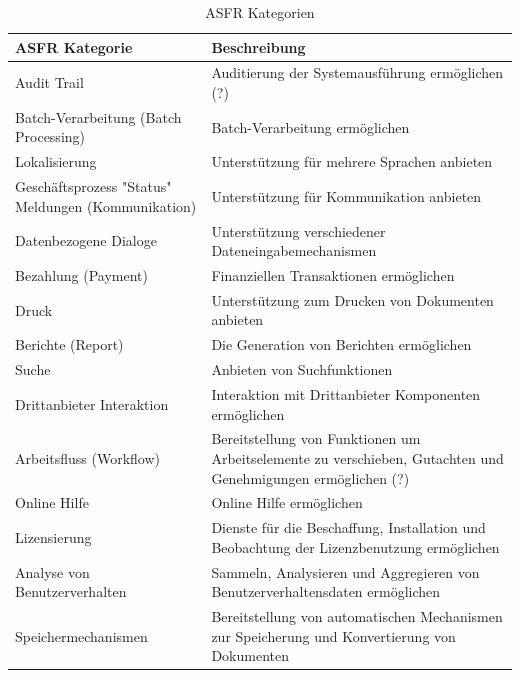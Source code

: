 \begin{table}[h] %
\caption{ASFR Kategorien \cite{Ros02}}
\centering
\begin{tabular}{|p{3cm}|p{5cm}|}
	\hline
	\textbf{ASFR Kategorie} & \textbf{Beschreibung} \\ %
	\hline
  	Audit Trail & Auditierung der Systemausführung ermöglichen (?) \\%
	\hline
	Batch-Verarbeitung (Batch Processing) & Batch-Verarbeitung ermöglichen \\
	\hline
	Lokalisierung & Unterstützung für mehrere Sprachen anbieten \\
	\hline
	Geschäftsprozess "Status" Meldungen (Kommunikation) & Unterstützung für Kommunikation anbieten \\
	\hline
	Datenbezogene Dialoge & Unterstützung verschiedener Dateneingabemechanismen \\
	\hline
	Bezahlung (Payment) & Finanziellen Transaktionen ermöglichen \\
	\hline
	Druck & Unterstützung zum Drucken von Dokumenten anbieten \\
	\hline
	Berichte (Report) & Die Generation von Berichten ermöglichen \\
	\hline
	Suche & Anbieten von Suchfunktionen \\
	\hline
	Drittanbieter Interaktion & Interaktion mit Drittanbieter Komponenten ermöglichen \\
	\hline
	Arbeitsfluss (Workflow) & Bereitstellung von Funktionen um Arbeitselemente zu verschieben, Gutachten und Genehmigungen ermöglichen (?)\\
	\hline
	Online Hilfe & Online Hilfe ermöglichen \\
	\hline
	Lizensierung & Dienste für die Beschaffung, Installation und Beobachtung der Lizenzbenutzung ermöglichen \\
	\hline
	Analyse von Benutzerverhalten & Sammeln, Analysieren und Aggregieren von Benutzerverhaltensdaten ermöglichen \\
	\hline
	Speichermechanismen & Bereitstellung von automatischen Mechanismen zur Speicherung und Konvertierung von Dokumenten \\
	\hline
\end{tabular}
\label{tab:asfr_category_table}
\end{table}

